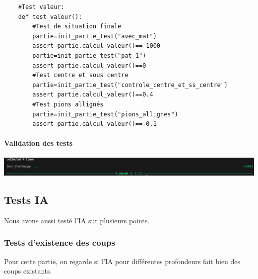 \documentclass{article}
\begin{document}
\begin{verbatim}
    #Test valeur:
    def test_valeur():
        #Test de situation finale
        partie=init_partie_test("avec_mat")
        assert partie.calcul_valeur()==-1000
        partie=init_partie_test("pat_1")
        assert partie.calcul_valeur()==0
        #Test centre et sous centre
        partie=init_partie_test("controle_centre_et_ss_centre")
        assert partie.calcul_valeur()==0.4
        #Test pions allignés
        partie=init_partie_test("pions_allignes")
        assert partie.calcul_valeur()==-0.1
\end{verbatim}
\paragraph{Validation des tests}
\begin{center}
    \includegraphics{pytest_EtatJeu.png}
\end{center}
\subsection{Tests IA}
Nous avons aussi testé l'IA sur plusieurs points. 

\subsubsection{Tests d'existence des coups}
Pour cette partie, on regarde si l'IA pour différentes profondeurs fait bien des coups existants.
\end{document}
